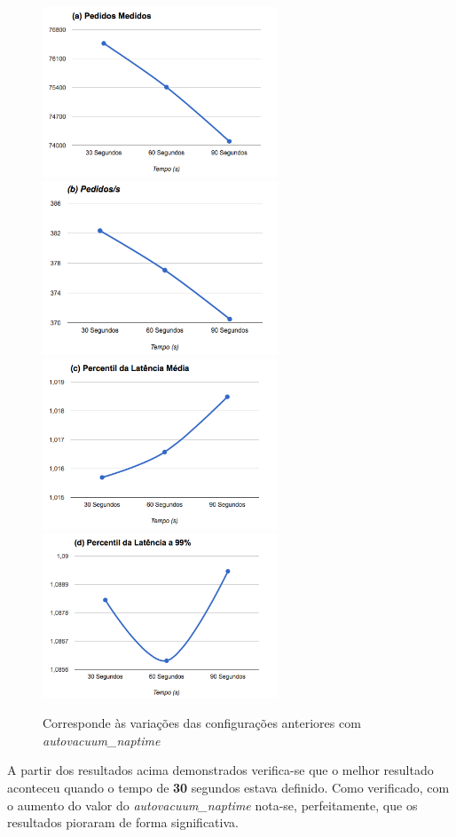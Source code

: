 \begin{figure}[ht!]
\centering
\includegraphics[width=70mm]{img/questao_3/sb_ecs_cs_vacuum_a.png}
\includegraphics[width=70mm]{img/questao_3/sb_ecs_cs_vacuum_b.png}
\includegraphics[width=70mm]{img/questao_3/sb_ecs_cs_vacuum_c.png}
\includegraphics[width=70mm]{img/questao_3/sb_ecs_cs_vacuum_d.png}
\caption{Corresponde às variações das configurações anteriores com \textit{autovacuum\_naptime}}
\end{figure}

A partir dos resultados acima demonstrados verifica-se que o melhor resultado aconteceu quando o tempo de \textbf{30} segundos estava definido. Como verificado, com o aumento do valor do \textit{autovacuum\_naptime} nota-se, perfeitamente, que os resultados pioraram de forma significativa.

